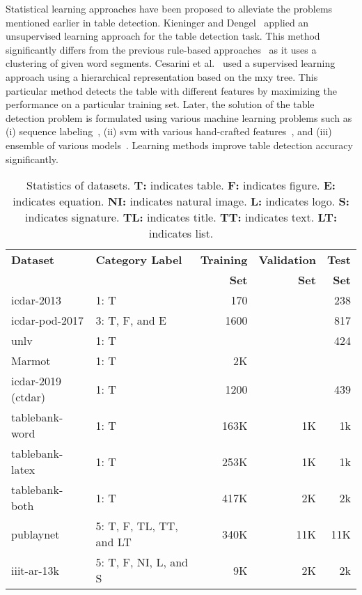 \documentclass[a4paper,conference]{IEEEtran}
\begin{document}
Statistical learning approaches have been proposed to alleviate the problems mentioned earlier in table detection. Kieninger and Dengel~\cite{kieninger1998t} applied an unsupervised learning approach for the table detection task. This method significantly differs from the previous rule-based approaches~\cite{hirayama1995method,green1995recognition,Tupaj96extractingtabular,hu1999medium,gatos2005automatic,shafait2010table} as it uses a clustering of given word segments. Cesarini et al.~\cite{cesarini2002trainable} used a supervised learning approach using a hierarchical representation based on the {\sc mxy} tree. This particular method detects the table with different features by maximizing the performance on a particular training set. Later, the solution of the table detection problem is formulated using various machine learning problems such as (i) sequence labeling~\cite{e2009learning}, (ii) {\sc svm} with various hand-crafted features~\cite{kasar2013learning}, and (iii) ensemble of various models~\cite{fan2015table}. Learning methods improve table detection accuracy significantly.

\begin{table}[h!]
\addtolength{\tabcolsep}{-4.0pt}
\begin{center}
\begin{tabular}{|l|l|r|r|r|} \hline
\textbf{Dataset} &\textbf{Category Label} &\textbf{Training} &\textbf{Validation} &\textbf{Test}  \\ 
                 &   &\textbf{Set} &\textbf{Set} &\textbf{Set} \\ \hline
{\sc icdar-2013}     &1: T &170 &  &238 \\
{\sc icdar-pod-2017} &3: T, F, and E &1600 & &817 \\
{\sc unlv}           &1: T &   &   &424 \\
Marmot               &1: T &2K &  &  \\
{\sc icdar-2019} (c{\sc td}a{\sc r}) &1: T &1200 & &439 \\
{\sc t}able{\sc b}ank-{w}ord\footnotemark[1]           &1: T &163K &1K &1k \\
{\sc t}able{\sc b}ank-{\sc l}a{\sc t}e{\sc x}\footnotemark[1]  &1: T &253K &1K &1k \\
{\sc t}able{\sc b}ank-both\footnotemark[1]           &1: T &417K &2K &2k \\
{\sc p}ub{\sc l}ay{\sc n}et\footnotemark[1]          &5: T, F, TL, TT, and LT &340K &11K &11K \\
{\sc iiit-ar-13k}                    &5: T, F, NI, L, and S   &9K &2K &2k \\ \hline
\end{tabular}
\end{center}
\caption{Statistics of datasets. \textbf{T:} indicates table. \textbf{F:} indicates figure. \textbf{E:} indicates equation. \textbf{NI:} indicates natural image. \textbf{L:} indicates logo. \textbf{S:} indicates signature. \textbf{TL:} indicates title. \textbf{TT:} indicates text. \textbf{LT:} indicates list. \label{table_statistics_dataset}}
\end{table}
\end{document}
